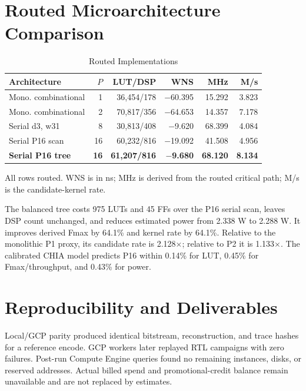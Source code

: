 \documentclass[journal]{IEEEtran}
\begin{document}
\section{Routed Microarchitecture Comparison}
\begin{table}[!t]
\caption{Routed Implementations}
\label{tab:routed}
\centering
\scriptsize
\setlength{\tabcolsep}{1.8pt}
\begin{tabularx}{\columnwidth}{@{}>{\raggedright\arraybackslash}X r r r r r@{}}
\toprule
\textbf{Architecture} & \textbf{$P$} & \textbf{LUT/DSP} & \textbf{WNS} &
\textbf{MHz} & \textbf{M/s} \\
\midrule
Mono. combinational & 1 & 36,454/178 & $-$60.395 & 15.292 & 3.823 \\
Mono. combinational & 2 & 70,817/356 & $-$64.653 & 14.357 & 7.178 \\
Serial d3, w31 & 8 & 30,813/408 & $-$9.620 & 68.399 & 4.084 \\
Serial P16 scan & 16 & 60,232/816 & $-$19.092 & 41.508 & 4.956 \\
\textbf{Serial P16 tree} & \textbf{16} & \textbf{61,207/816} &
\textbf{$-$9.680} & \textbf{68.120} & \textbf{8.134} \\
\bottomrule
\end{tabularx}
\par\vspace{1pt}
\scriptsize All rows routed. WNS is in ns; MHz is derived from the routed
critical path; M/s is the candidate-kernel rate.
\end{table}

The balanced tree costs 975 LUTs and 45 FFs over the P16 serial scan, leaves
DSP count unchanged, and reduces estimated power from 2.338 W to 2.288 W. It
improves derived Fmax by 64.1\% and kernel rate by 64.1\%. Relative to the
monolithic P1 proxy, its candidate rate is 2.128$\times$; relative to P2 it is
1.133$\times$. The calibrated CHIA model predicts P16 within 0.14\% for LUT,
0.45\% for Fmax/throughput, and 0.43\% for power.

\section{Reproducibility and Deliverables}
Local/GCP parity produced identical bitstream, reconstruction, and trace hashes
for a reference encode. GCP workers later replayed RTL campaigns with zero
failures. Post-run Compute Engine queries found no remaining instances, disks,
or reserved addresses. Actual billed spend and promotional-credit balance
remain unavailable and are not replaced by estimates.
\end{document}

